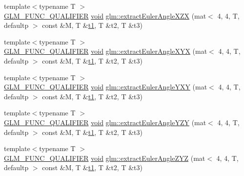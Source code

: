 \begin{DoxyCompactItemize}
\item 
{\footnotesize template$<$typename T $>$ }\\\hyperlink{setup_8hpp_a33fdea6f91c5f834105f7415e2a64407}{G\+L\+M\+\_\+\+F\+U\+N\+C\+\_\+\+Q\+U\+A\+L\+I\+F\+I\+ER} \hyperlink{_s_d_l__opengles2__gl2ext_8h_ae5d8fa23ad07c48bb609509eae494c95}{void} \hyperlink{group__gtx__euler__angles_gacf0bc6c031f25fa3ee0055b62c8260d0}{glm\+::extract\+Euler\+Angle\+X\+ZX} (mat$<$ 4, 4, T, defaultp $>$ const \&M, T \&\hyperlink{_s_d_l__opengl__glext_8h_af48031a37b713afa3b0d0d7d29653d7c}{t1}, T \&t2, T \&t3)
\item 
{\footnotesize template$<$typename T $>$ }\\\hyperlink{setup_8hpp_a33fdea6f91c5f834105f7415e2a64407}{G\+L\+M\+\_\+\+F\+U\+N\+C\+\_\+\+Q\+U\+A\+L\+I\+F\+I\+ER} \hyperlink{_s_d_l__opengles2__gl2ext_8h_ae5d8fa23ad07c48bb609509eae494c95}{void} \hyperlink{group__gtx__euler__angles_gaf1077a72171d0f3b08f022ab5ff88af7}{glm\+::extract\+Euler\+Angle\+X\+YX} (mat$<$ 4, 4, T, defaultp $>$ const \&M, T \&\hyperlink{_s_d_l__opengl__glext_8h_af48031a37b713afa3b0d0d7d29653d7c}{t1}, T \&t2, T \&t3)
\item 
{\footnotesize template$<$typename T $>$ }\\\hyperlink{setup_8hpp_a33fdea6f91c5f834105f7415e2a64407}{G\+L\+M\+\_\+\+F\+U\+N\+C\+\_\+\+Q\+U\+A\+L\+I\+F\+I\+ER} \hyperlink{_s_d_l__opengles2__gl2ext_8h_ae5d8fa23ad07c48bb609509eae494c95}{void} \hyperlink{group__gtx__euler__angles_gaab8868556361a190db94374e9983ed39}{glm\+::extract\+Euler\+Angle\+Y\+XY} (mat$<$ 4, 4, T, defaultp $>$ const \&M, T \&\hyperlink{_s_d_l__opengl__glext_8h_af48031a37b713afa3b0d0d7d29653d7c}{t1}, T \&t2, T \&t3)
\item 
{\footnotesize template$<$typename T $>$ }\\\hyperlink{setup_8hpp_a33fdea6f91c5f834105f7415e2a64407}{G\+L\+M\+\_\+\+F\+U\+N\+C\+\_\+\+Q\+U\+A\+L\+I\+F\+I\+ER} \hyperlink{_s_d_l__opengles2__gl2ext_8h_ae5d8fa23ad07c48bb609509eae494c95}{void} \hyperlink{group__gtx__euler__angles_ga11dad972c109e4bf8694c915017c44a6}{glm\+::extract\+Euler\+Angle\+Y\+ZY} (mat$<$ 4, 4, T, defaultp $>$ const \&M, T \&\hyperlink{_s_d_l__opengl__glext_8h_af48031a37b713afa3b0d0d7d29653d7c}{t1}, T \&t2, T \&t3)
\item 
{\footnotesize template$<$typename T $>$ }\\\hyperlink{setup_8hpp_a33fdea6f91c5f834105f7415e2a64407}{G\+L\+M\+\_\+\+F\+U\+N\+C\+\_\+\+Q\+U\+A\+L\+I\+F\+I\+ER} \hyperlink{_s_d_l__opengles2__gl2ext_8h_ae5d8fa23ad07c48bb609509eae494c95}{void} \hyperlink{group__gtx__euler__angles_gafdfa880a64b565223550c2d3938b1aeb}{glm\+::extract\+Euler\+Angle\+Z\+YZ} (mat$<$ 4, 4, T, defaultp $>$ const \&M, T \&\hyperlink{_s_d_l__opengl__glext_8h_af48031a37b713afa3b0d0d7d29653d7c}{t1}, T \&t2, T \&t3)

\end{DoxyCompactItemize}
